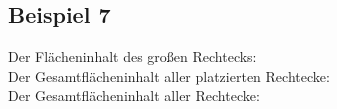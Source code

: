 \subsection{Beispiel 7}\label{ex:7}
Der Flächeninhalt des großen Rechtecks: \\
Der Gesamtflächeninhalt aller platzierten Rechtecke: \\
Der Gesamtflächeninhalt aller Rechtecke: 